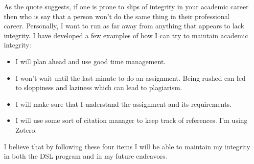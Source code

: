 \documentclass[man]{apa7}
\begin{document}
As the quote suggests, if one is prone to slips of integrity in your academic career then who is say that a person won't do the same thing in their professional career. Personally, I want to run as far away from anything that appears to lack integrity.
I have developed a few examples of how I can try to maintain academic integrity:

\begin{itemize}
  \item I will plan ahead and use good time management.    
  \item I won't wait until the last minute to do an assignment. Being rushed can led to sloppiness and laziness which can lead to plagiarism.
  \item I will make sure that I understand the assignment and its requirements.
  \item I will use some sort of citation manager to keep track of references. I'm using Zotero.
\end{itemize}
I believe that by following these four items I will be able to maintain my integrity in both the DSL program and in my future endeavors.

\printbibliography
\end{document}
